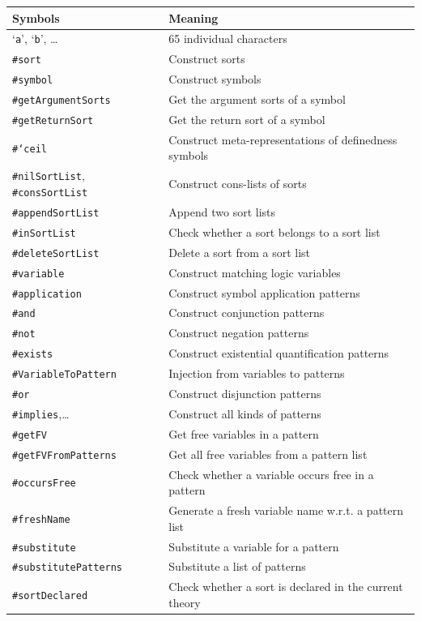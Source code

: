 \documentclass[UTF8,11pt]{article}
\theoremstyle{plain}
\theoremstyle{definition}
\theoremstyle{remark}
\newcommand{\sharpsymbol}{\#}
\newcommand{\Ksort}{\texttt{\sharpsymbol sort}}
\newcommand{\Ksymbol}{\texttt{\sharpsymbol symbol}}
\newcommand{\KSymbolceil}{\texttt{\sharpsymbol `ceil}}
\newcommand{\KgetArgumentSorts}{\texttt{\sharpsymbol getArgumentSorts}}
\newcommand{\KgetReturnSort}{\texttt{\sharpsymbol getReturnSort}}
\newcommand{\KnilKSortList}{\texttt{\sharpsymbol nilSortList}}
\newcommand{\KconsKSortList}{\texttt{\sharpsymbol consSortList}}
\newcommand{\KappendKSortList}{\texttt{\sharpsymbol appendSortList}}
\newcommand{\KinKSortList}{\texttt{\sharpsymbol inSortList}}
\newcommand{\KdeleteKSortList}{\texttt{\sharpsymbol deleteSortList}}
\newcommand{\KVariableToKPattern}{\texttt{\sharpsymbol VariableToPattern}}
\newcommand{\Kvariable}{\texttt{\sharpsymbol variable}}
\newcommand{\Kand}{\texttt{\sharpsymbol  \slashsymbol and}}
\newcommand{\Kor}{\texttt{\sharpsymbol \slashsymbol  or}}
\newcommand{\Kimplies}{\texttt{\sharpsymbol  \slashsymbol implies}}
\newcommand{\Knot}{\texttt{\sharpsymbol  \slashsymbol not}}
\newcommand{\Kapplication}{\texttt{\sharpsymbol application}}
\newcommand{\Kexists}{\texttt{\sharpsymbol \slashsymbol  exists}}
\newcommand{\KgetFV}{\texttt{\sharpsymbol getFV}}
\newcommand{\KgetFVFromPatterns}{\texttt{\sharpsymbol getFVFromPatterns}}
\newcommand{\KoccursFree}{\texttt{\sharpsymbol occursFree}}
\newcommand{\KfreshName}{\texttt{\sharpsymbol freshName}}
\newcommand{\KsortDeclared}{\texttt{\sharpsymbol sortDeclared}}
\newcommand{\Ksubstitute}{\texttt{\sharpsymbol substitute}}
\newcommand{\KsubstitutePatterns}{\texttt{\sharpsymbol substitutePatterns}}
\newcommand{\quottt}[1]{\textrm{\lq\texttt{#1}\rq}}
\newcommand{\slashsymbol}{\symbol{92}}
\begin{document}
	\begin{longtable}{l|l}
	    \textbf{Symbols} & \textbf{Meaning} \\
	    \hline
	    \endhead
	    \quottt{a}, \quottt{b}, \dots & 65 individual characters \\
	    \Ksort & Construct sorts \\
	    \Ksymbol & Construct symbols \\
	    \KgetArgumentSorts & Get the argument sorts of a symbol \\
	    \KgetReturnSort & Get the return sort of a symbol \\
	    \KSymbolceil & Construct meta-representations of definedness symbols 
	    \\
	    \KnilKSortList, \KconsKSortList & Construct cons-lists of sorts \\
	    \KappendKSortList & Append two sort lists \\
	    \KinKSortList & Check whether a sort belongs to a sort list \\
	    \KdeleteKSortList & Delete a sort from a sort list \\
	    \Kvariable & Construct matching logic variables \\
	    \Kapplication & Construct symbol application patterns \\
	    \Kand & Construct conjunction patterns \\
	    \Knot & Construct negation patterns \\
	    \Kexists & Construct existential quantification patterns \\
	    \KVariableToKPattern & Injection from variables to patterns \\
	    \Kor & Construct disjunction patterns \\
	    \Kimplies,\dots & Construct all kinds of patterns \\
	    \KgetFV & Get free variables in a pattern \\
	    \KgetFVFromPatterns & Get all free variables from a pattern list \\
	    \KoccursFree & Check whether a variable occurs free in a pattern \\
	    \KfreshName & Generate a fresh variable name w.r.t. a pattern list \\
	    \Ksubstitute & Substitute a variable for a pattern \\
	    \KsubstitutePatterns & Substitute a list of patterns \\
	    \KsortDeclared & Check whether a sort is declared in the current theory 

\end{longtable}
\end{document}
